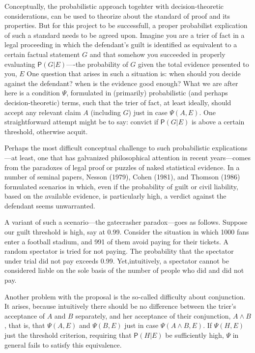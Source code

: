 \documentclass[11pt,dvipsnames,enabledeprecatedfontcommands]{scrartcl}
\newcommand{\pr}[1]{\mathsf{P}(#1)}
\begin{document}
Conceptually, the probabilistic approach togehter with
decision-theoretic considerations, can be used to theorize about the
standard of proof and its properties. But for this project to be
successfull, a proper probabilist explication of such a standard needs
to be agreed upon. Imagine you are a trier of fact in a legal proceeding
in which the defendant's guilt is identified as equivalent to a certain
factual statement \(G\) and that somehow you succeeded in properly
evaluating \(\pr{G\vert E}\)----the probability of \(G\) given the total
evidence presented to you, \(E\) One question that arises in such a
situation is: when should you decide against the defendant? when is the
evidence good enough? What we are after here is a condition \(\Psi\),
formulated in (primarily) probabilistic (and perhaps decision-theoretic)
terms, such that the trier of fact, at least ideally, should accept any
relevant claim \(A\) (including \(G\)) just in case \(\Psi(A, E)\). One
straightforward attempt might be to say: convict if \(\pr{G\vert E}\) is
above a certain threshold, otherwise acquit.

Perhaps the most difficult conceptual challenge to such probabilistic
explications---at least, one that has galvanized philosophical attention
in recent years---comes from the paradoxes of legal proof or puzzles of
naked statistical evidence. In a number of seminal papers, Nesson
(1979), Cohen (1981), and Thomson (1986) formulated scenarios in which,
even if the probability of guilt or civil liability, based on the
available evidence, is particularly high, a verdict against the
defendant seems unwarranted.

A variant of such a scenario---the gatecrasher paradox---goes as
follows. Suppose our guilt threshold is high, say at 0.99. Consider the
situation in which 1000 fans enter a football stadium, and 991 of them
avoid paying for their tickets. A random spectator is tried for not
paying. The probability that the spectator under trial did not pay
exceeds 0.99. Yet,intuitively, a spectator cannot be considered liable
on the sole basis of the number of people who did and did not pay.

Another problem with the proposal is the so-called difficulty about
conjunction. It arises, because intuitively there should be no
difference between the trier's acceptance of \(A\) and \(B\) separately,
and her acceptance of their conjunction, \(A\wedge B\) , that is, that
\(\Psi(A,E)\) and \(\Psi(B,E)\) just in case \(\Psi(A\wedge B, E)\). If
\(\Psi(H,E)\) just the threshold criterion, requiring that
\(\pr{H\vert E}\) be sufficiently high, \(\Psi\) in general fails to
satisfy this equivalence.
\end{document}
